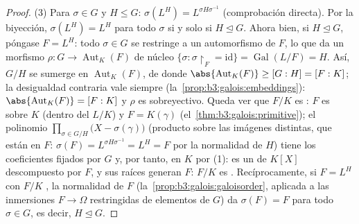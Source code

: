 \begin{proof}
(3) Para $\sigma \in G$ y $H \leq G$: $\sigma(L^H) =
L^{\sigma H\sigma^{-1}}$ (comprobación directa). Por la biyección,
$\sigma(L^H) = L^H$ para todo $\sigma$ si y solo si
$H \trianglelefteq G$. Ahora bien, si $H \trianglelefteq G$, póngase
$F = L^H$: todo $\sigma \in
G$ se restringe a un automorfismo de $F$, lo que da un morfismo $\rho
\colon G \to \operatorname{Aut}_K(F)$ de núcleo $\{\sigma :
\sigma\restriction_F = \mathrm{id}\} = \operatorname{Gal}(L/F) =
H$. Así, $G/H$ se sumerge en $\operatorname{Aut}_K(F)$, de donde
$\abs{\operatorname{Aut}_K(F)} \geq [G:H] = [F:K]$; la desigualdad
contraria vale siempre (la~\cref{prop:b3:galois:embeddings}):
$\abs{\operatorname{Aut}_K(F)} = [F:K]$ y $\rho$ es sobreyectivo. Queda
ver que $F/K$ es : $F$ es
 sobre $K$ (dentro del
 $L/K$) y $F = K(\gamma)$
(el~\cref{thm:b3:galois:primitive}); el polinomio
$\prod_{\sigma \in G/H}\bigl(X - \sigma(\gamma)\bigr)$ (producto sobre
las imágenes distintas, que están en $F$: $\sigma(F) =
L^{\sigma H\sigma^{-1}} = L^H = F$ por la normalidad de $H$) tiene los
coeficientes fijados por $G$ y, por tanto, en $K$ por (1): es un
 de $K[X]$
descompuesto por $F$, y sus raíces generan $F$: $F/K$ es
. Recíprocamente, si $F = L^H$
con $F/K$ , la normalidad de $F$
(la~\cref{prop:b3:galois:galoisorder}, aplicada a las inmersiones
$F \to \Omega$ restringidas de elementos de $G$) da $\sigma(F) = F$ para
todo $\sigma \in G$, es decir, $H
\trianglelefteq G$.
\end{proof}


